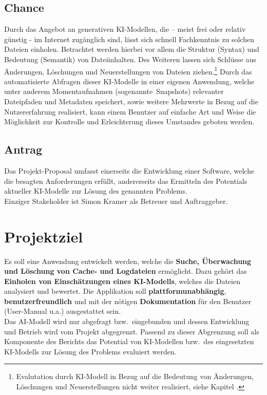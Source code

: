 \documentclass[a4paper,12pt]{report}
\begin{document}
    \subsection{Chance}\label{subsec:chance}
    Durch das Angebot an generativen KI-Modellen, die – meist frei oder relativ günstig - im
    Internet zugänglich sind, lässt sich schnell Fachkenntnis zu solchen Dateien einholen.
    Betrachtet werden hierbei vor allem die Struktur (Syntax) und Bedeutung (Semantik) von Dateiinhalten.
    Des Weiteren lassen sich Schlüsse aus Änderungen, Löschungen und Neuerstellungen von Dateien ziehen.\footnote{Evalutation durch KI-Modell in Bezug auf die Bedeutung von Änderungen, Löschungen und Neuerstellungen nicht weiter realisiert, siehe Kapitel .}
    Durch das automatisierte Abfragen dieser KI-Modelle in einer eigenen Anwendung,
    welche unter anderem Momentaufnahmen (sogenannte\ Snapshots) relevanter Dateipfaden und Metadaten speichert,
    sowie weitere Mehrwerte in Bezug auf die Nutzererfahrung realisiert, kann einem
    Benutzer auf einfache Art und Weise die Möglichkeit zur Kontrolle und Erleichterung dieses Umstandes
    geboten werden.

    \subsection{Antrag}\label{subsec:stakeholder}
    Das Projekt-Proposal umfasst einerseits die Entwicklung einer Software, welche die besagten Anforderungen erfüllt,
    andererseits das Ermitteln des Potentials aktueller KI-Modelle zur Lösung des genannten Problems.\\
    Einziger Stakeholder ist Simon Kramer als Betreuer und Auftraggeber.\\


    \section{Projektziel}\label{sec:projektziel}
    Es soll eine Anwendung entwickelt werden, welche die \textbf{Suche, Überwachung und Löschung von Cache- und Logdateien} ermöglicht.
    Dazu gehört das \textbf{Einholen von Einschätzungen eines KI-Modells}, welches die Dateien analysiert und bewertet.
    Die Applikation soll \textbf{plattformunabhängig}, \textbf{benutzerfreundlich} und mit der nötigen \textbf{Dokumentation} für den Benutzer (User-Manual u.a.) ausgestattet sein.
    \\Das AI-Modell wird nur abgefragt bzw.\ eingebunden und dessen Entwicklung und Betrieb
    wird vom Projekt abgegrenzt.
    Passend zu dieser Abgrenzung soll als Komponente des Berichts das Potential von KI-Modellen bzw.\ des eingesetzten KI-Modells zur Lösung des Problems evaluiert werden.
\end{document}

